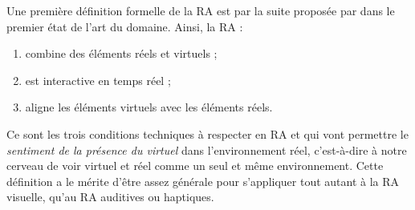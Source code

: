 
Une première définition formelle de la RA est par la suite proposée par \cite{Azuma1997} dans le premier état de l'art du domaine. Ainsi, la RA :
\begin{enumerate}
  \item combine des éléments réels et virtuels ;
  \item est interactive en temps réel ;
  \item aligne les éléments virtuels avec les éléments réels.
\end{enumerate}
\medskip

Ce sont les trois conditions techniques à respecter en RA et qui vont permettre le \emph{sentiment de la présence du virtuel} dans l'environnement réel, c'est-à-dire à notre cerveau de voir virtuel et réel comme un seul et même environnement. Cette définition a le mérite d'être assez générale pour s'appliquer tout autant à la RA visuelle, qu'au RA auditives ou haptiques.


